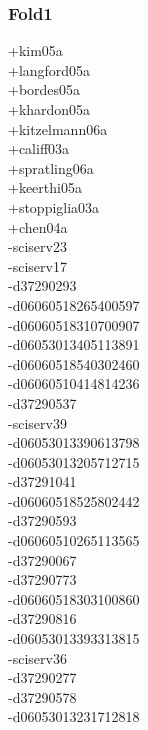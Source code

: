 \begin{multicols}{3}
\subsubsection*{Fold1}
+kim05a\\
+langford05a\\
+bordes05a\\
+khardon05a\\
+kitzelmann06a\\
+califf03a\\
+spratling06a\\
+keerthi05a\\
+stoppiglia03a\\
+chen04a\\
-sciserv23\\
-sciserv17\\
-d37290293\\
-d06060518265400597\\
-d06060518310700907\\
-d06053013405113891\\
-d06060518540302460\\
-d06060510414814236\\
-d37290537\\
-sciserv39\\
-d06053013390613798\\
-d06053013205712715\\
-d37291041\\
-d06060518525802442\\
-d37290593\\
-d06060510265113565\\
-d37290067\\
-d37290773\\
-d06060518303100860\\
-d37290816\\
-d06053013393313815\\
-sciserv36\\
-d37290277\\
-d37290578\\
-d06053013231712818\\

\end{multicols}
